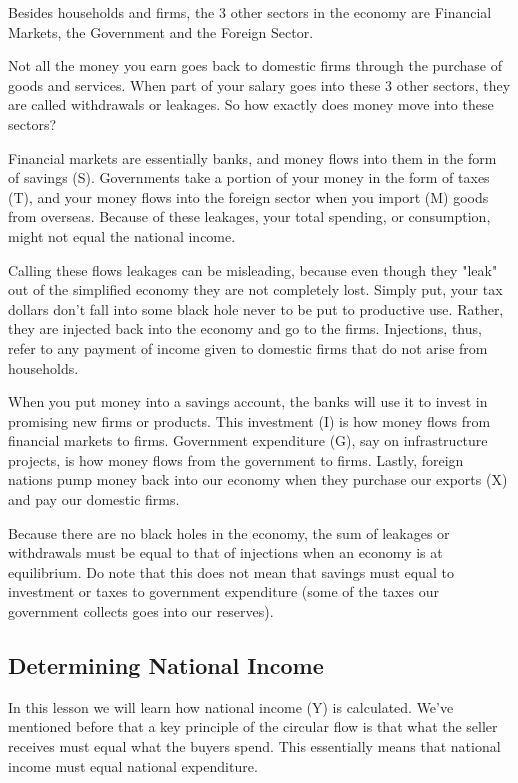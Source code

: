 Besides households and firms, the 3 other sectors in the economy are Financial Markets, the Government and the Foreign Sector.

Not all the money you earn goes back to domestic firms through the purchase of goods and services. When part of your salary goes into these 3 other sectors, they are called withdrawals or leakages. So how exactly does money move into these sectors?

Financial markets are essentially banks, and money flows into them in the form of savings (S). Governments take a portion of your money in the form of taxes (T), and your money flows into the foreign sector when you import (M) goods from overseas. Because of these leakages, your total spending, or consumption, might not equal the national income.

Calling these flows leakages can be misleading, because even though they "leak" out of the simplified economy they are not completely lost. Simply put, your tax dollars don’t fall into some black hole never to be put to productive use. Rather, they are injected back into the economy and go to the firms. Injections, thus, refer to any payment of income given to domestic firms that do not arise from households.

When you put money into a savings account, the banks will use it to invest in promising new firms or products. This investment (I) is how money flows from financial markets to firms. Government expenditure (G), say on infrastructure projects, is how money flows from the government to firms. Lastly, foreign nations pump money back into our economy when they purchase our exports (X) and pay our domestic firms. 

Because there are no black holes in the economy, the sum of leakages or withdrawals must be equal to that of injections when an economy is at equilibrium. Do note that this does not mean that savings must equal to investment or taxes to government expenditure (some of the taxes our government collects goes into our reserves). 
\subsection{Determining National Income}
In this lesson we will learn how national income (Y) is calculated. We’ve mentioned before that a key principle of the circular flow is that what the seller receives must equal what the buyers spend. This essentially means that national income must equal national expenditure. 

